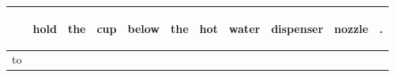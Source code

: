 \documentclass[landscape]{article}
\newcommand{\ssp}{\hspace{2pt}}
\begin{document}
\noindent\begin{tabular}{|l|p{10pt}|p{10pt}|p{10pt}|p{10pt}|p{10pt}|p{10pt}|p{10pt}|p{10pt}|p{10pt}|p{10pt}|}
\hline
&\begin{sideways}\cellcolor{ref0}hold\hspace{12pt}\end{sideways}&\begin{sideways}\cellcolor{ref1}the\hspace{12pt}\end{sideways}&\begin{sideways}\cellcolor{ref2}cup\hspace{12pt}\end{sideways}&\begin{sideways}\cellcolor{ref3}below\hspace{12pt}\end{sideways}&\begin{sideways}\cellcolor{ref4}the\hspace{12pt}\end{sideways}&\begin{sideways}\cellcolor{ref5}hot\hspace{12pt}\end{sideways}&\begin{sideways}\cellcolor{ref6}water\hspace{12pt}\end{sideways}&\begin{sideways}\cellcolor{ref7}dispenser\hspace{12pt}\end{sideways}&\begin{sideways}\cellcolor{ref8}nozzle\hspace{12pt}\end{sideways}&\begin{sideways}\cellcolor{ref9}.\hspace{12pt}\end{sideways}\\
\hline
\ssp to \ssp&\hspace{2pt}&\hspace{2pt}&\hspace{2pt}&\hspace{2pt}&\hspace{2pt}&\hspace{2pt}&\hspace{2pt}&\hspace{2pt}&\hspace{2pt}&\hspace{2pt}\\

\end{tabular}
\end{document}
